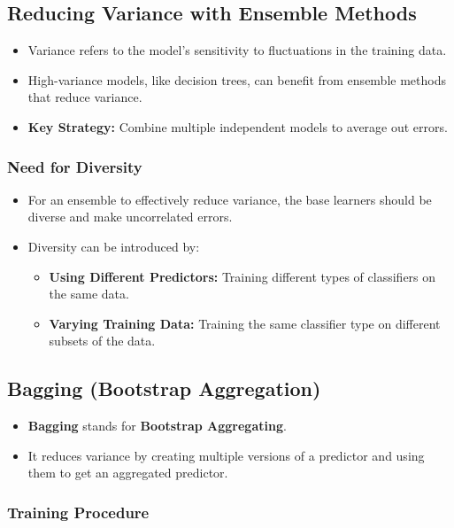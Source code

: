 \documentclass{article}
\begin{document}
\subsection{Reducing Variance with Ensemble Methods}

\begin{itemize}
    \item Variance refers to the model's sensitivity to fluctuations in the training data.
    \item High-variance models, like decision trees, can benefit from ensemble methods that reduce variance.
    \item \textbf{Key Strategy:} Combine multiple independent models to average out errors.
\end{itemize}

\subsubsection{Need for Diversity}

\begin{itemize}
    \item For an ensemble to effectively reduce variance, the base learners should be diverse and make uncorrelated errors.
    \item Diversity can be introduced by:
    \begin{itemize}
        \item \textbf{Using Different Predictors:} Training different types of classifiers on the same data.
        \item \textbf{Varying Training Data:} Training the same classifier type on different subsets of the data.
    \end{itemize}
\end{itemize}

\subsection{Bagging (Bootstrap Aggregation)}

\begin{itemize}
    \item \textbf{Bagging} stands for \textbf{Bootstrap Aggregating}.
    \item It reduces variance by creating multiple versions of a predictor and using them to get an aggregated predictor.
\end{itemize}

\subsubsection{Training Procedure}
\end{document}
